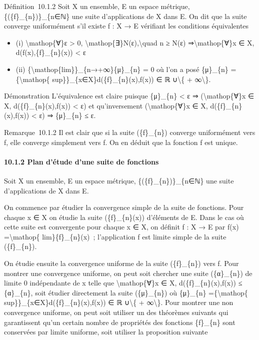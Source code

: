 \documentclass[]{article}
\begin{document}
Définition~10.1.2 Soit X un ensemble, E un espace métrique,
\{(\{f\}\_\{n\})\}\_\{n∈ℕ\} une suite d'applications de X dans E. On dit
que la suite converge uniformément s'il existe f : X → E vérifiant les
conditions équivalentes

\begin{itemize}
\itemsep1pt\parskip0pt
\item
  (i) \textbackslash{}mathop\{∀\}ε \textgreater{} 0,
  \textbackslash{}mathop\{∃\}N(ε),\textbackslash{}quad n ≥ N(ε)
  ⇒\textbackslash{}mathop\{∀\}x ∈ X, d(f(x),\{f\}\_\{n\}(x)) \textless{}
  ε
\item
  (ii) \{\textbackslash{}mathop\{lim\}\}\_\{n→+∞\}\{μ\}\_\{n\} = 0 où
  l'on a posé \{μ\}\_\{n\} =\{\textbackslash{}mathop\{
  sup\}\}\_\{x∈X\}d(\{f\}\_\{n\}(x),f(x)) ∈ ℝ ∪\textbackslash{}\{ +
  ∞\textbackslash{}\}.
\end{itemize}

Démonstration L'équivalence est claire puisque \{μ\}\_\{n\} \textless{}
ε ⇒ (\textbackslash{}mathop\{∀\}x ∈ X, d(\{f\}\_\{n\}(x),f(x))
\textless{} ε) et qu'inversement (\textbackslash{}mathop\{∀\}x ∈ X,
d(\{f\}\_\{n\}(x),f(x)) \textless{} ε) ⇒ \{μ\}\_\{n\} ≤ ε.

Remarque~10.1.2 Il est clair que si la suite (\{f\}\_\{n\}) converge
uniformément vers f, elle converge simplement vers f. On en déduit que
la fonction f est unique.

\paragraph{10.1.2 Plan d'étude d'une suite de fonctions}

Soit X un ensemble, E un espace métrique, \{(\{f\}\_\{n\})\}\_\{n∈ℕ\}
une suite d'applications de X dans E.

On commence par étudier la convergence simple de la suite de fonctions.
Pour chaque x ∈ X on étudie la suite (\{f\}\_\{n\}(x)) d'éléments de E.
Dans le cas où cette suite est convergente pour chaque x ∈ X, on définit
f : X → E par f(x) =\textbackslash{}mathop\{ lim\}\{f\}\_\{n\}(x)~;
l'application f est limite simple de la suite (\{f\}\_\{n\}).

On étudie ensuite la convergence uniforme de la suite (\{f\}\_\{n\})
vers f. Pour montrer une convergence uniforme, on peut soit chercher une
suite (\{α\}\_\{n\}) de limite 0 indépendante de x telle que
\textbackslash{}mathop\{∀\}x ∈ X, d(\{f\}\_\{n\}(x),f(x)) ≤
\{α\}\_\{n\}, soit étudier directement la suite (\{μ\}\_\{n\}) où
\{μ\}\_\{n\} =\{\textbackslash{}mathop\{
sup\}\}\_\{x∈X\}d(\{f\}\_\{n\}(x),f(x)) ∈ ℝ ∪\textbackslash{}\{ +
∞\textbackslash{}\}. Pour montrer une non convergence uniforme, on peut
soit utiliser un des théorèmes suivants qui garantissent qu'un certain
nombre de propriétés des fonctions \{f\}\_\{n\} sont conservées par
limite uniforme, soit utiliser la proposition suivante
\end{document}
